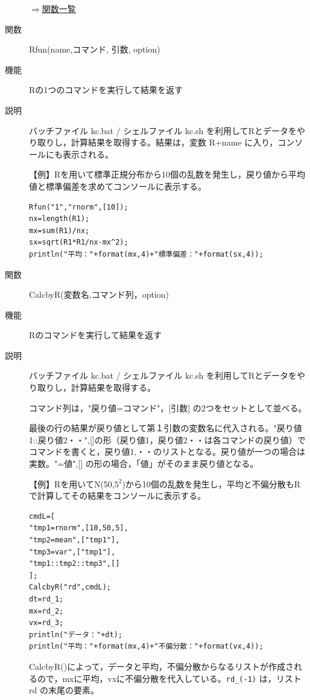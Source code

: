 \documentclass[papersize,a4paper,12pt,uplatex]{jsarticle}
\begin{document}
\begin{description}
\begin{flushright}\hyperlink{functionlist}{$\Rightarrow$関数一覧}\end{flushright}

\hypertarget{rfun}{}
\item[関数]Rfun(name,コマンド, 引数, option)
\item[機能]Rの1つのコマンドを実行して結果を返す
\item[説明]バッチファイル kc.bat / シェルファイル kc.sh を利用してRとデータをやり取りし，計算結果を取得する。結果は，変数 R+name に入り，コンソールにも表示される。

\vspace{\baselineskip}
【例】Rを用いて標準正規分布から10個の乱数を発生し，戻り値から平均値と標準偏差を求めてコンソールに表示する。
\begin{verbatim}
Rfun("1","rnorm",[10]);
nx=length(R1);
mx=sum(R1)/nx;
sx=sqrt(R1*R1/nx-mx^2);
println("平均："+format(mx,4)+"標準偏差："+format(sx,4));
\end{verbatim}

\hypertarget{calcbyr}{}
\item[関数]CalcbyR(変数名,コマンド列，option)
\item[機能]Rのコマンドを実行して結果を返す
\item[説明]バッチファイル kc.bat / シェルファイル kc.sh を利用してRとデータをやり取りし，計算結果を取得する。

コマンド列は，"戻り値=コマンド"，[引数] の2つをセットとして並べる。

最後の行の結果が戻り値として第１引数の変数名に代入される。"戻り値1::戻り値2・・",[]の形（戻り値1，戻り値2・・は各コマンドの戻り値）でコマンドを書くと，戻り値1,・・のリストとなる。戻り値が一つの場合は実数。"=値",[] の形の場合，「値」がそのまま戻り値となる。

\vspace{\baselineskip}
【例】Rを用いてN(50,$5^2$)から10個の乱数を発生し，平均と不偏分散もRで計算してその結果をコンソールに表示する。
\begin{verbatim}
cmdL=[
"tmp1=rnorm",[10,50,5],
"tmp2=mean",["tmp1"],
"tmp3=var",["tmp1"],
"tmp1::tmp2::tmp3",[]
];
CalcbyR("rd",cmdL);
dt=rd_1;
mx=rd_2;
vx=rd_3;
println("データ："+dt);
println("平均："+format(mx,4)+"不偏分散："+format(vx,4));
\end{verbatim}
CalcbyR()によって，データと平均，不偏分散からなるリストが作成されるので，mxに平均，vxに不偏分散を代入している。\verb|rd_(-1)| は，リスト rd の末尾の要素。


\end{description}
\end{document}
